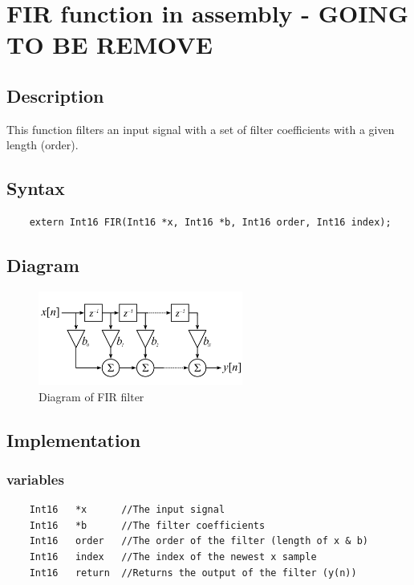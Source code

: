 
\section{FIR function in assembly - GOING TO BE REMOVE}
\subsection{Description}
This function filters an input signal with a set of filter coefficients with a given length (order).


\subsection{Syntax} 
\begin{lstlisting}
	extern Int16 FIR(Int16 *x, Int16 *b, Int16 order, Int16 index);
\end{lstlisting}

\subsection{Diagram}
\begin{figure} [h]
	\centering
	\includegraphics[width=0.6\textwidth]{../Journal/Code/FIRfilter}
	\caption{Diagram of FIR filter}
	\label{Fig:FIR_filter}
\end{figure}


\subsection{Implementation}

\subsubsection{variables}
\begin{lstlisting}
	Int16 	*x 		//The input signal
	Int16	*b		//The filter coefficients
	Int16	order	//The order of the filter (length of x & b)
	Int16	index	//The index of the newest x sample
	Int16	return	//Returns the output of the filter (y(n))
\end{lstlisting}

